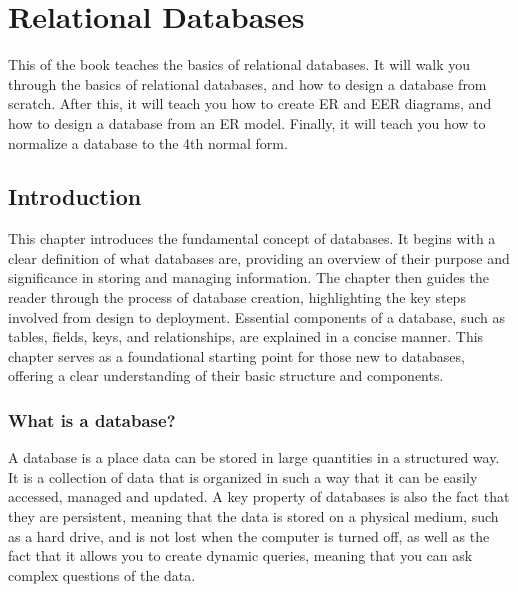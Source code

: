 

\part{Relational Databases}
\label{part:relationaldatabases}
This  of the book teaches the basics of relational databases. It will walk you through the basics of relational databases, and how to design a database from scratch. After this, it will teach you how to create ER and EER diagrams, and how to design a database from an ER model. Finally, it will teach you how to normalize a database to the 4th normal form.

\chapter{Introduction}
\label{chap:relational:introduction}
This chapter introduces the fundamental concept of databases. It begins with a clear definition of what databases are, providing an overview of their purpose and significance in storing and managing information. The chapter then guides the reader through the process of database creation, highlighting the key steps involved from design to deployment. Essential components of a database, such as tables, fields, keys, and relationships, are explained in a concise manner. This chapter serves as a foundational starting point for those new to databases, offering a clear understanding of their basic structure and components.

\section{What is a database?}
A database is a place data can be stored in large quantities in a structured way. It is a collection of data that is organized in such a way that it can be easily accessed, managed and updated. A key property of databases is also the fact that they are persistent, meaning that the data is stored on a physical medium, such as a hard drive, and is not lost when the computer is turned off, as well as the fact that it allows you to create dynamic queries, meaning that you can ask complex questions of the data.

